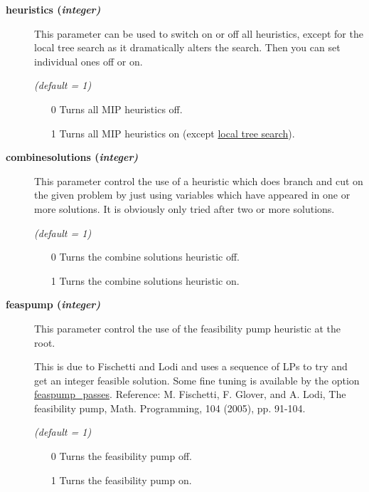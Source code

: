 \begin{description}

\item[\label{heuristics}\hypertarget{heuristics}
{\textbf{heuristics (\slshape{integer})}}]\hspace{1.0in}

This parameter can be used to switch on or off all heuristics, except for the local tree search as it dramatically alters the search.
Then you can set individual ones off or on.

\textsl{(default = 1)}
\begin{itemize}
\item[0] 
Turns all MIP heuristics off.
\item[1] 
Turns all MIP heuristics on (except \hyperlink{localtreesearch}{local tree search}).
\end{itemize}

\item[\label{combinesolutions}\hypertarget{combinesolutions}
{\textbf{combinesolutions (\slshape{integer})}}]\hspace{1.0in}

This parameter control the use of a heuristic which does branch and cut on the given problem by just using variables which have appeared in one or more solutions.
It is obviously only tried after two or more solutions.

\textsl{(default = 1)}
\begin{itemize}
\item[0] 
Turns the combine solutions heuristic off.
\item[1] 
Turns the combine solutions heuristic on.
\end{itemize}

\item[\label{feaspump}\hypertarget{feaspump}
{\textbf{feaspump (\slshape{integer})}}]\hspace{1.0in}

This parameter control the use of the feasibility pump heuristic at the root.

This is due to Fischetti and Lodi and uses a sequence of LPs to try and get an integer feasible solution.
Some fine tuning is available by the option \hyperlink{feaspump_passes}{feaspump\_passes}.
Reference: M. Fischetti, F. Glover, and A. Lodi, The feasibility pump, Math. Programming, 104 (2005), pp. 91-104.

\textsl{(default = 1)}
\begin{itemize}
\item[0] 
Turns the feasibility pump off.
\item[1] 
Turns the feasibility pump on.
\end{itemize}


\end{description}
